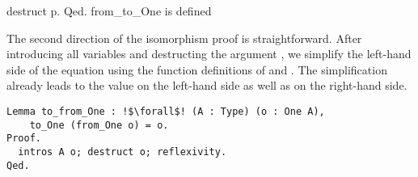\begin{cproof}{destruct p. Qed.}
  from_to_One is defined
\end{cproof}

The second direction of the isomorphism proof is straightforward.
After introducing all variables and destructing the argument , we simplify the left-hand side of the equation using the function definitions of  and .
The simplification already leads to the value  on the left-hand side as well as on the right-hand side.

\begin{verbatim}
Lemma to_from_One : !$\forall$! (A : Type) (o : One A),
    to_One (from_One o) = o.
Proof.
  intros A o; destruct o; reflexivity.
Qed.
\end{verbatim}
